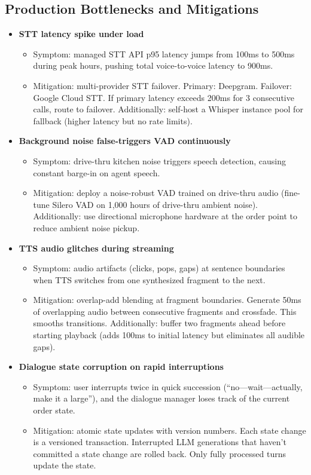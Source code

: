 \subsection*{Production Bottlenecks and Mitigations}

\begin{itemize}
  \item \textbf{STT latency spike under load}
  \begin{itemize}
    \item Symptom: managed STT API p95 latency jumps from 100ms to 500ms during peak hours, pushing total voice-to-voice latency to 900ms.
    \item Mitigation: multi-provider STT failover. Primary: Deepgram. Failover: Google Cloud STT. If primary latency exceeds 200ms for 3 consecutive calls, route to failover. Additionally: self-host a Whisper instance pool for fallback (higher latency but no rate limits).
  \end{itemize}

  \item \textbf{Background noise false-triggers VAD continuously}
  \begin{itemize}
    \item Symptom: drive-thru kitchen noise triggers speech detection, causing constant barge-in on agent speech.
    \item Mitigation: deploy a noise-robust VAD trained on drive-thru audio (fine-tune Silero VAD on 1,000 hours of drive-thru ambient noise). Additionally: use directional microphone hardware at the order point to reduce ambient noise pickup.
  \end{itemize}

  \item \textbf{TTS audio glitches during streaming}
  \begin{itemize}
    \item Symptom: audio artifacts (clicks, pops, gaps) at sentence boundaries when TTS switches from one synthesized fragment to the next.
    \item Mitigation: overlap-add blending at fragment boundaries. Generate 50ms of overlapping audio between consecutive fragments and crossfade. This smooths transitions. Additionally: buffer two fragments ahead before starting playback (adds 100ms to initial latency but eliminates all audible gaps).
  \end{itemize}

  \item \textbf{Dialogue state corruption on rapid interruptions}
  \begin{itemize}
    \item Symptom: user interrupts twice in quick succession (``no---wait---actually, make it a large''), and the dialogue manager loses track of the current order state.
    \item Mitigation: atomic state updates with version numbers. Each state change is a versioned transaction. Interrupted LLM generations that haven't committed a state change are rolled back. Only fully processed turns update the state.
  \end{itemize}


\end{itemize}
